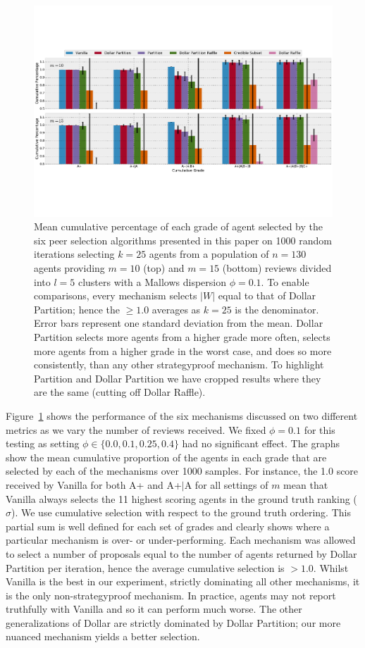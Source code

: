 \documentclass[letterpaper]{article}
\begin{document}
\begin{figure}[!ht]
\centering
\includegraphics[width=.8\textwidth]{./cumulative_grade_big-emb}
\caption{Mean cumulative percentage of each grade of agent selected by the six peer selection algorithms presented in this paper on 1000 random iterations selecting $k=25$ agents from a population of $n=130$ agents providing $m=10$ (top) and $m=15$ (bottom) reviews divided into $l=5$ clusters with a Mallows dispersion $\phi = 0.1$. To enable comparisons, every mechanism selects $|W|$ equal to that of Dollar Partition; hence the $\geq 1.0$ averages as $k=25$ is the denominator.
Error bars represent one standard deviation from the mean.
Dollar Partition selects more agents from a higher grade more often, selects more agents from a higher grade in the worst case, and does so more consistently, than any other strategyproof mechanism. To highlight Partition and Dollar Partition we have cropped results where they are the same (cutting off Dollar Raffle).}\label{fig:results}
\end{figure}

Figure~\ref{fig:results} shows the performance of the six mechanisms discussed on two different metrics as we vary the number of reviews received. We fixed $\phi=0.1$ for this testing as setting $\phi \in \{0.0, 0.1, 0.25, 0.4\}$ had no significant effect. The graphs show the mean cumulative proportion of the agents in each grade that are selected by each of the mechanisms over 1000 samples. For instance, the 1.0 score received by Vanilla for both A+ and A+$|$A for all settings of $m$ mean that Vanilla always selects the 11 highest scoring agents in the ground truth ranking ($\sigma$). We use cumulative selection with respect to the ground truth ordering.  This partial sum is well defined for each set of grades and clearly shows where a particular mechanism is over- or under-performing. Each mechanism was allowed to select a number of proposals equal to the number of agents returned by Dollar Partition per iteration, hence the average cumulative selection is $>1.0$.
Whilst Vanilla is the best in our experiment, strictly dominating all other mechanisms, it is the only non-strategyproof mechanism. In practice, agents may not report truthfully with Vanilla and so it can perform much worse.
The other generalizations of Dollar are strictly dominated by Dollar Partition; our more nuanced mechanism yields a better selection.
\end{document}
